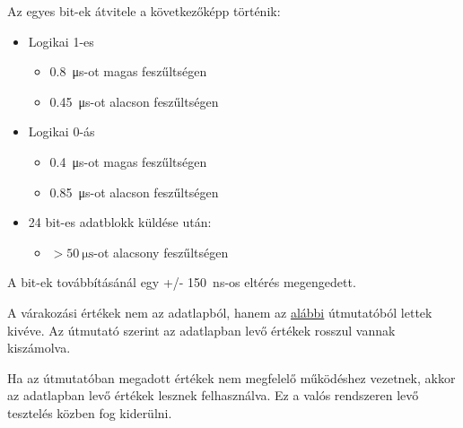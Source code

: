 \tab Az egyes bit-ek átvitele a következőképp történik:

\begin{itemize}
\item Logikai 1-es
	\begin{itemize}
	\item \SI{0.8}{\micro\second}-ot magas feszűltségen
	\item \SI{0.45}{\micro\second}-ot alacson feszűltségen
	\end{itemize}
\item Logikai 0-ás
	\begin{itemize}
	\item \SI{0.4}{\micro\second}-ot magas feszűltségen
	\item \SI{0.85}{\micro\second}-ot alacson feszűltségen
	\end{itemize}
\item 24 bit-es adatblokk küldése után: 
	\begin{itemize}
		\item $ > \SI{50}{\micro\second}$-ot alacsony feszűltségen
	\end{itemize}
\end{itemize}

\tab A bit-ek továbbításánál egy +/- \SI{150}{\nano\second}-os eltérés megengedett.

\tab A várakozási értékek nem az adatlapból, hanem az \href{https://learn.adafruit.com/adafruit-neopixel-uberguide}{alábbi} útmutatóból lettek kivéve. 
Az útmutató szerint az adatlapban levő értékek rosszul vannak kiszámolva.

\tab Ha az útmutatóban megadott értékek nem megfelelő működéshez vezetnek, akkor az adatlapban levő értékek lesznek felhasználva. 
Ez a valós rendszeren levő tesztelés közben fog kiderülni.

